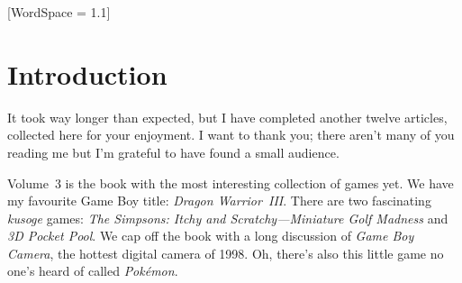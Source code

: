 \documentclass{book}
\newcommand{\gbeauthor}{Pierre-Luc Gagné}
\let\oldcenter\center
\let\oldendcenter\endcenter
\renewenvironment{center}{\setlength\topsep{0pt}\oldcenter}{\oldendcenter}
\begin{document}
\begingroup
\setlength{\columnsep}{1.7mm}
\setlength{\intextsep}{0mm}

\thispagestyle{empty}
\mbox{}
\vskip 70pt
\vfill
\newpage

\thispagestyle{empty}
\mbox{}
\vfill
\begin{center}
\fontsize{10pt}{12pt}\selectfont
{}
\end{center}
\newpage

\thispagestyle{empty}
\mbox{}
\vfill
\begin{raggedleft}
\dedication{\gbededication{}}
\vfill
\end{raggedleft}
\newpage

\begingroup
\let\cleardoublepage\clearpage
\tableofcontents
\endgroup
\thispagestyle{empty}
[WordSpace = 1.1]
\fontsize{12pt}{12pt}\selectfont\begingroup \chapter*{Introduction} \endgroup
It took way longer than expected, but I have completed another twelve articles, collected here for your enjoyment. I want to thank you; there aren’t many of you reading me but I’m grateful to have found a small audience.

Volume 3 is the book with the most interesting collection of games yet. We have my favourite Game Boy title: \emph{Dragon Warrior III}. There are two fascinating \emph{kusoge} games: \emph{The Simpsons: Itchy and Scratchy—Miniature Golf Madness} and \emph{3D Pocket Pool}. We cap off the book with a long discussion of \emph{Game Boy Camera}, the hottest digital camera of 1998. Oh, there’s also this little game no one’s heard of called \emph{Pokémon}.
\end{document}
